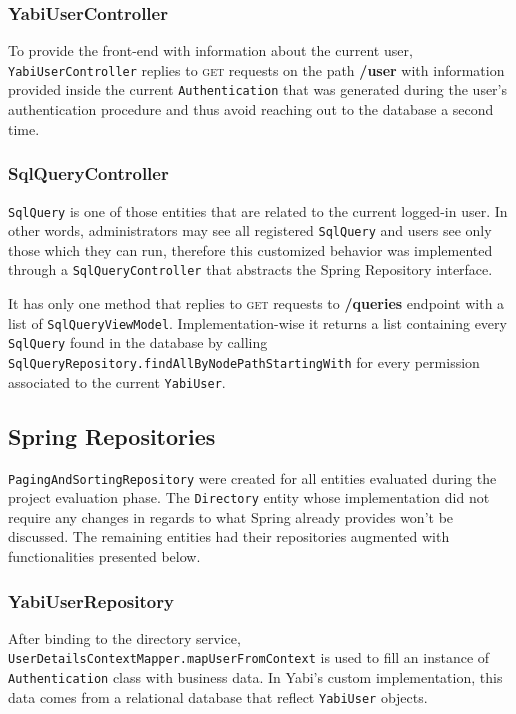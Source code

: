 \subsubsection{YabiUserController}
To provide the front-end with information about the current user, \texttt{YabiUserController} replies to \textsc{get} requests on the path \textbf{/user} with information provided inside the current \texttt{Authentication} that was generated during the user's authentication procedure and thus avoid reaching out to the database a second time.

\subsubsection{SqlQueryController}
\texttt{SqlQuery} is one of those entities that are related to the current logged-in user. In other words, administrators may see all registered \texttt{SqlQuery} and users see only those which they can run, therefore this customized behavior was implemented through a \texttt{SqlQueryController} that abstracts the Spring Repository interface.

It has only one method that replies to \textsc{get} requests to \textbf{/queries} endpoint with a list of \texttt{SqlQueryViewModel}. Implementation-wise it returns a list containing every \texttt{SqlQuery} found in the database by calling \texttt{SqlQueryRepository.findAllByNodePathStartingWith} for every permission associated to the current \texttt{YabiUser}.

\subsection{Spring Repositories}\label{impl:repos}
\texttt{PagingAndSortingRepository} were created for all entities evaluated during the project evaluation phase.
The \texttt{Directory} entity whose implementation did not require any changes in regards to what Spring already provides won't be discussed.
The remaining entities had their repositories augmented with functionalities presented below.

\subsubsection{YabiUserRepository}
After binding to the directory service, \texttt{UserDetailsContextMapper.mapUserFromContext} is used to fill an instance of \texttt{Authentication} class with business data. In \gls{Yabi}'s custom implementation, this data comes from a relational database that reflect \texttt{YabiUser} objects.

